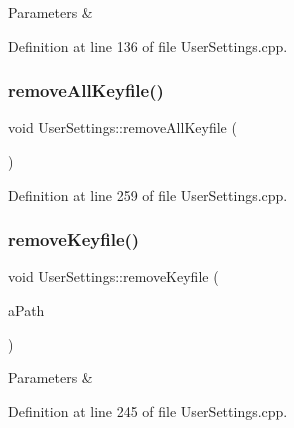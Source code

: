 \begin{DoxyParams}{Parameters}
{\em } & \\
\hline
\end{DoxyParams}


Definition at line 136 of file User\+Settings.\+cpp.

\mbox{\label{class_user_settings_adb2b7ecfdda9d2ea1c017a0696dcbb16}} 
\subsubsection{\texorpdfstring{remove\+All\+Keyfile()}{removeAllKeyfile()}}
{\footnotesize\ttfamily void User\+Settings\+::remove\+All\+Keyfile (\begin{DoxyParamCaption}{ }\end{DoxyParamCaption})}



Definition at line 259 of file User\+Settings.\+cpp.

\mbox{\label{class_user_settings_aca7047180ee2b733fa6ba0578cbb7a1a}} 
\subsubsection{\texorpdfstring{remove\+Keyfile()}{removeKeyfile()}}
{\footnotesize\ttfamily void User\+Settings\+::remove\+Keyfile (\begin{DoxyParamCaption}\item[{const Q\+String \&}]{a\+Path }\end{DoxyParamCaption})}


\begin{DoxyParams}{Parameters}
{\em } & \\
\hline
\end{DoxyParams}


Definition at line 245 of file User\+Settings.\+cpp.

\mbox{\label{class_user_settings_a2041cb2d5b4ec14183f7504a170ee234}} 

